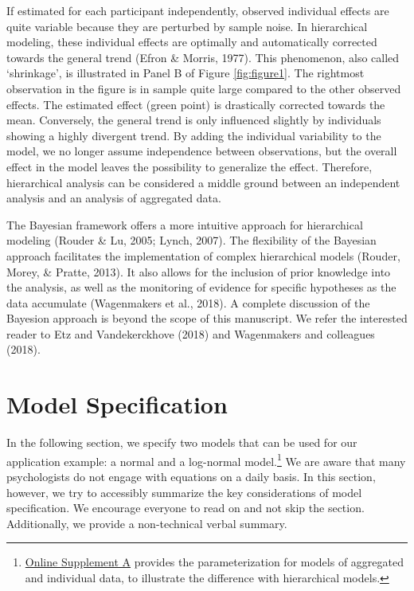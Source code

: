\documentclass[
  english,
  doc,floatsintext]{apa6}
\begin{document}
If estimated for each participant independently, observed individual effects are quite variable because they are perturbed by sample noise. In hierarchical modeling, these individual effects are optimally and automatically corrected towards the general trend (Efron \& Morris, 1977). This phenomenon, also called `shrinkage', is illustrated in Panel B of Figure \ref{fig:figure1}. The rightmost observation in the figure is in sample quite large compared to the other observed effects. The estimated effect (green point) is drastically corrected towards the mean. Conversely, the general trend is only influenced slightly by individuals showing a highly divergent trend. By adding the individual variability to the model, we no longer assume independence between observations, but the overall effect in the model leaves the possibility to generalize the effect. Therefore, hierarchical analysis can be considered a middle ground between an independent analysis and an analysis of aggregated data.

The Bayesian framework offers a more intuitive approach for hierarchical modeling (Rouder \& Lu, 2005; Lynch, 2007). The flexibility of the Bayesian approach facilitates the implementation of complex hierarchical models (Rouder, Morey, \& Pratte, 2013). It also allows for the inclusion of prior knowledge into the analysis, as well as the monitoring of evidence for specific hypotheses as the data accumulate (Wagenmakers et al., 2018). A complete discussion of the Bayesion approach is beyond the scope of this manuscript. We refer the interested reader to Etz and Vandekerckhove (2018) and Wagenmakers and colleagues (2018).

\hypertarget{model-specification}{%
\section{Model Specification}\label{model-specification}}

In the following section, we specify two models that can be used for our application example: a normal and a log-normal model.\footnote{\href{https://github.com/MyrtheV/Bayesian-Hierarchical-Modelling-An-Introduction-and-Reassessment/blob/main/A\%20-\%20Model\%20Parameterization\%20/Online-Supplement-A---Model-Parameterization-for-Aggregated-and-Individual-Models.pdf}{Online Supplement A} provides the parameterization for models of aggregated and individual data, to illustrate the difference with hierarchical models.} We are aware that many psychologists do not engage with equations on a daily basis. In this section, however, we try to accessibly summarize the key considerations of model specification. We encourage everyone to read on and not skip the section. Additionally, we provide a non-technical verbal summary.
\end{document}
